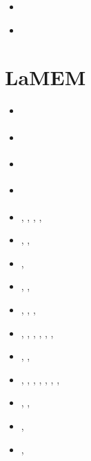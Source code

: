 \begin{small}
\begin{itemize}
\item[\twothousandnineteen] \textcite{demh19}
\item[\twothousandtwentytwo] \textcite{vacd22}
\end{itemize}
\end{small}


\section{LaMEM}

\begin{small}
\begin{itemize}
\item[\twothousandeight]       \textcite{scbe08}
\item[\twothousandten]         \textcite{kamm10}
\item[\twothousandeleven]      \textcite{lemk11}
\item[\twothousandtwelve]      \textcite{may12}
\item[\twothousandfourteen]    \textcite{lesh14},  \textcite{cokm14},  \textcite{bakp14}, 
                               \textcite{feka14a}, \textcite{feka14b}
\item[\twothousandfifteen]     \textcite{puka15},  \textcite{feka15},  \textcite{cofk15}
\item[\twothousandsixteen]     \textcite{kapb16},  \textcite{coyc16}
\item[\twothousandeighteen]    \textcite{pukp18},  \textcite{rekp18},  \textcite{repk18}
\item[\twothousandnineteen]    \textcite{eitp19},  \textcite{hooi19}, 
                               \textcite{pust19},  \textcite{wakz19}
\item[\twothousandtwenty]      \textcite{eitf20},  \textcite{spsk20}, \textcite{pikw20},
                               \textcite{pust20},  \textcite{yakl20}, 
                               \textcite{spbe20},  \textcite{rehp20}
\item[\twothousandtwentyone]   \textcite{suky21},  \textcite{yalw21}, \textcite{waky21}
\item[\twothousandtwentytwo]   \textcite{toyp22},  \textcite{alrr22a}, \textcite{mokj22},
                               \textcite{pusk22},  \textcite{spbk22},  \textcite{lisb22},
                               \textcite{hura22},  \textcite{rokp22}
\item[\twothousandtwentythree] \textcite{gacy23},  \textcite{rida23}, \textcite{yazl23}
\item[\twothousandtwentyfour]  \textcite{durr24},  \textcite{tibi24}
\item[\twothousandtwentyfive]  \textcite{sckl25},  \textcite{pasp25}
\end{itemize}
\end{small}

